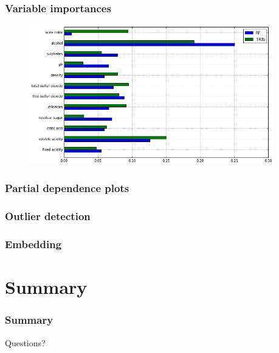 \documentclass{beamer}
\begin{document}
\begin{frame}[fragile]
  \frametitle{Variable importances}

\begin{figure}
\includegraphics[width=0.95\textwidth]{./figures/importances.png}
\end{figure}

\end{frame}

\begin{frame}
  \frametitle{Partial dependence plots}
\end{frame}

\begin{frame}
  \frametitle{Outlier detection}
\end{frame}

\begin{frame}
  \frametitle{Embedding}
\end{frame}






\section{Summary}

\begin{frame}
  \frametitle{Summary}
\end{frame}

\begin{frame}
\begin{center}
{\Huge  Questions?}
\end{center}
\end{frame}
\end{document}
